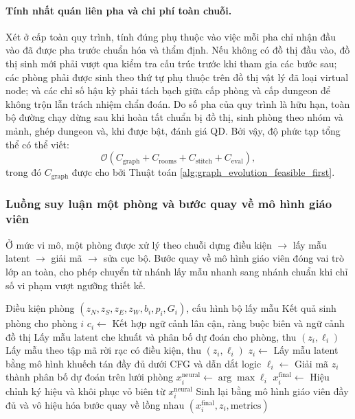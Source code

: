 \documentclass[oneside,a4paper,12pt]{extreport}
\begin{document}
\paragraph{Tính nhất quán liên pha và chi phí toàn chuỗi.}
Xét ở cấp toàn quy trình, tính đúng phụ thuộc vào việc mỗi pha chỉ nhận đầu vào
đã được pha trước chuẩn hóa và thẩm định. Nếu không có đồ thị đầu vào, đồ thị
sinh mới phải vượt qua kiểm tra cấu trúc trước khi tham gia các bước sau; các
phòng phải được sinh theo thứ tự phụ thuộc trên đồ thị vật lý đã loại virtual
node; và các chỉ số hậu kỳ phải tách bạch giữa cấp phòng và cấp dungeon để
không trộn lẫn trách nhiệm chẩn đoán. Do số pha của quy trình là hữu hạn, toàn
bộ đường chạy dừng sau khi hoàn tất chuẩn bị đồ thị, sinh phòng theo nhóm và
mảnh, ghép dungeon và, khi được bật, đánh giá QD. Bởi vậy, độ phức tạp tổng
thể có thể viết:
\begin{equation}
\mathcal{O}\!\left(C_{\text{graph}} + C_{\text{rooms}} + C_{\text{stitch}} + C_{\text{eval}}\right),
\end{equation}
trong đó $C_{\text{graph}}$ được cho bởi Thuật toán \ref{alg:graph_evolution_feasible_first}.

\subsubsection{Luồng suy luận một phòng và bước quay về mô hình giáo viên}
Ở mức vi mô, một phòng được xử lý theo chuỗi dựng điều kiện $\rightarrow$ lấy mẫu latent $\rightarrow$ giải mã $\rightarrow$ sửa cục bộ. Bước quay về mô hình giáo viên đóng vai trò lớp an toàn, cho phép chuyển từ nhánh lấy mẫu nhanh sang nhánh chuẩn khi chỉ số vi phạm vượt ngưỡng thiết kế.

\begin{algorithm}[H]
\caption{Sinh một phòng với bước quay về mô hình giáo viên}
\label{alg:generate_room_fallback}
\begin{algorithmic}[1]
\Require Điều kiện phòng $(z_N,z_S,z_E,z_W,b_i,p_i,G_i)$, cấu hình bộ lấy mẫu
\Ensure Kết quả sinh phòng cho phòng $i$
\State $c_i \gets$ Kết hợp ngữ cảnh lân cận, ràng buộc biên và ngữ cảnh đồ thị
  \State Lấy mẫu latent che khuất và phân bố dự đoán cho phòng, thu $(z_i,\ell_i)$
  \State Lấy mẫu theo tập mã rời rạc có điều kiện, thu $(z_i,\ell_i)$
\Else
  \State $z_i \gets$ Lấy mẫu latent bằng mô hình khuếch tán đầy đủ dưới CFG và dẫn dắt logic
  \State $\ell_i \gets$ Giải mã $z_i$ thành phân bố dự đoán trên lưới phòng
\EndIf
\State $x_i^{\text{neural}} \gets \arg\max\ell_i$
\State $x_i^{\text{final}} \gets$ Hiệu chỉnh ký hiệu và khôi phục vỏ biên từ $x_i^{\text{neural}}$
  \State Sinh lại bằng mô hình giáo viên đầy đủ và vô hiệu hóa bước quay về lồng nhau
\EndIf
\State \Return $(x_i^{\text{final}}, z_i, \text{metrics})$
\end{algorithmic}
\end{algorithm}
\end{document}
